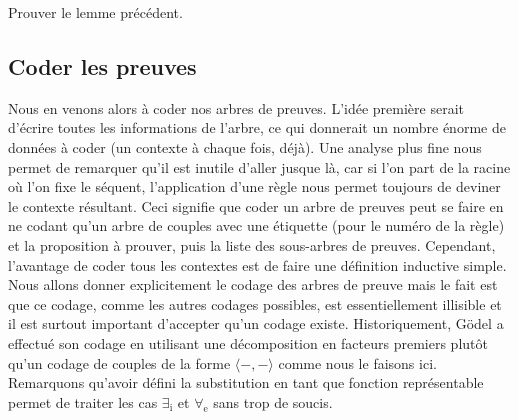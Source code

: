 \begin{exo}
    Prouver le lemme précédent.
\end{exo}

\subsection{Coder les preuves}

Nous en venons alors à coder nos arbres de preuves. L'idée première serait d'écrire toutes les informations de l'arbre, ce qui donnerait un nombre énorme de données à coder (un contexte à chaque fois, déjà). Une analyse plus fine nous permet de remarquer qu'il est inutile d'aller jusque là, car si l'on part de la racine où l'on fixe le séquent, l'application d'une règle nous permet toujours de deviner le contexte résultant. Ceci signifie que coder un arbre de preuves peut se faire en ne codant qu'un arbre de couples avec une étiquette (pour le numéro de la règle) et la proposition à prouver, puis la liste des sous-arbres de preuves. Cependant, l'avantage de coder tous les contextes est de faire une définition inductive simple. Nous allons donner explicitement le codage des arbres de preuve mais le fait est que ce codage, comme les autres codages possibles, est essentiellement illisible et il est surtout important d'accepter qu'un codage existe. Historiquement, Gödel a effectué son codage en utilisant une décomposition en facteurs premiers plutôt qu'un codage de couples de la forme $\langle -,-\rangle$ comme nous le faisons ici. Remarquons qu'avoir défini la substitution en tant que fonction représentable permet de traiter les cas $\exists_\mathrm i$ et $\forall_\mathrm e$ sans trop de soucis.

\vspace{1cm}

